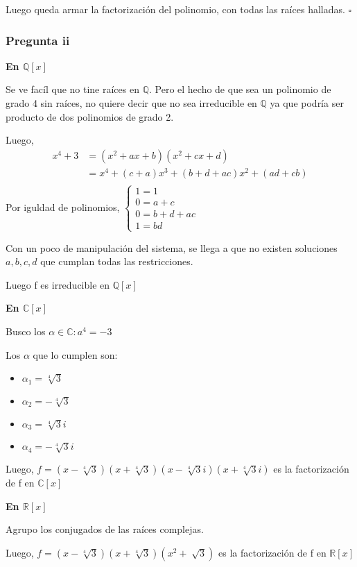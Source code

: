 Luego queda armar la factorización del polinomio, con todas las raíces halladas. $\square$

\subsubsection{Pregunta ii}

\textbf{En $ \mathbb{Q}[x] $}

Se ve facíl que no tine raíces en $\mathbb{Q}$. Pero el hecho de que sea un polinomio de grado 4 sin raíces, no quiere decir que no
sea irreducible en $ \mathbb{Q} $ ya que podría ser producto de dos polinomios de grado 2.

Luego,
\begin{align*}
    x^4 + 3 &= (x^2 + ax + b)(x^2 + cx + d) \\
    &= x^4 + (c+a)x^3 + (b+d+ac)x^2 + (ad+cb) \\
\end{align*}
Por iguldad de polinomios, $ \begin{cases}
    1=1 \\
    0 = a+c \\
    0 = b+d+ac \\
    1 = bd
\end{cases} $

Con un poco de manipulación del sistema, se llega a que no existen soluciones $ a,b,c,d $ que cumplan todas las restricciones.

Luego f es irreducible en $ \mathbb{Q}[x] $

\textbf{En $ \mathbb{C}[x] $}

Busco los $ \alpha \in \mathbb{C}: a^4 = -3 $

Los $ \alpha $ que lo cumplen son:
\begin{itemize}
    \item $ \alpha_1 = \sqrt[4]{3} $
    \item $ \alpha_2 = -\sqrt[4]{3} $
    \item $ \alpha_3 = \sqrt[4]{3}i $
    \item $ \alpha_4 = -\sqrt[4]{3}i $
\end{itemize}
Luego, $ f = (x-\sqrt[4]{3})(x+\sqrt[4]{3})(x-\sqrt[4]{3}i)(x+\sqrt[4]{3}i) $ es la factorización de f en $ \mathbb{C}[x] $

\textbf{En $ \mathbb{R}[x] $}

Agrupo los conjugados de las raíces complejas.

Luego, $ f = (x-\sqrt[4]{3})(x+\sqrt[4]{3})(x^2 + \sqrt[]{3}) $ es la factorización de f en $ \mathbb{R}[x] $

